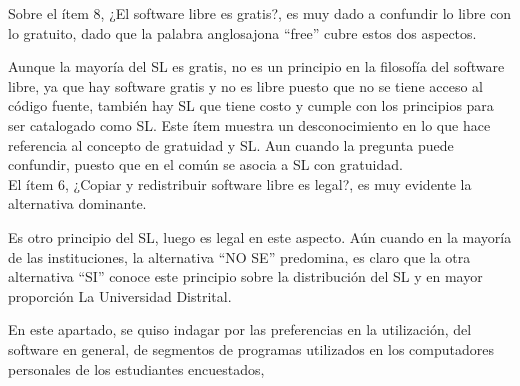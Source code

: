 \begin{multicols}{2}
Sobre el \'item 8, ¿El software libre es gratis?, es muy dado a confundir lo libre con lo gratuito, dado que la palabra anglosajona ``free'' cubre estos dos aspectos.\\

\begin{center}
\end{center}

Aunque la mayor\'ia del SL es gratis, no es un principio en la filosof\'ia del software libre, ya que hay software gratis y no es libre puesto que no se tiene acceso al c\'odigo fuente, tambi\'en hay SL que tiene costo y cumple con los principios para ser catalogado como SL. Este \'item muestra un desconocimiento en lo que hace referencia al concepto de gratuidad y SL. Aun cuando la pregunta puede confundir, puesto que en el com\'un se asocia a SL con gratuidad.\\

El \'item 6, ¿Copiar y redistribuir software libre es legal?, es muy evidente la alternativa dominante. \\

\begin{center}
\end{center}


Es otro principio del SL, luego es legal en este aspecto. Aún cuando en la mayor\'ia de las instituciones, la alternativa “NO SE” predomina, es claro que la otra alternativa “SI” conoce este principio sobre la distribuci\'on del SL y en mayor proporci\'on La Universidad Distrital.\\

\begin{center}
\end{center}


En este apartado, se quiso indagar por las preferencias en la utilización, del software en general, de segmentos de programas utilizados en los computadores personales de los estudiantes encuestados,



\end{multicols}
